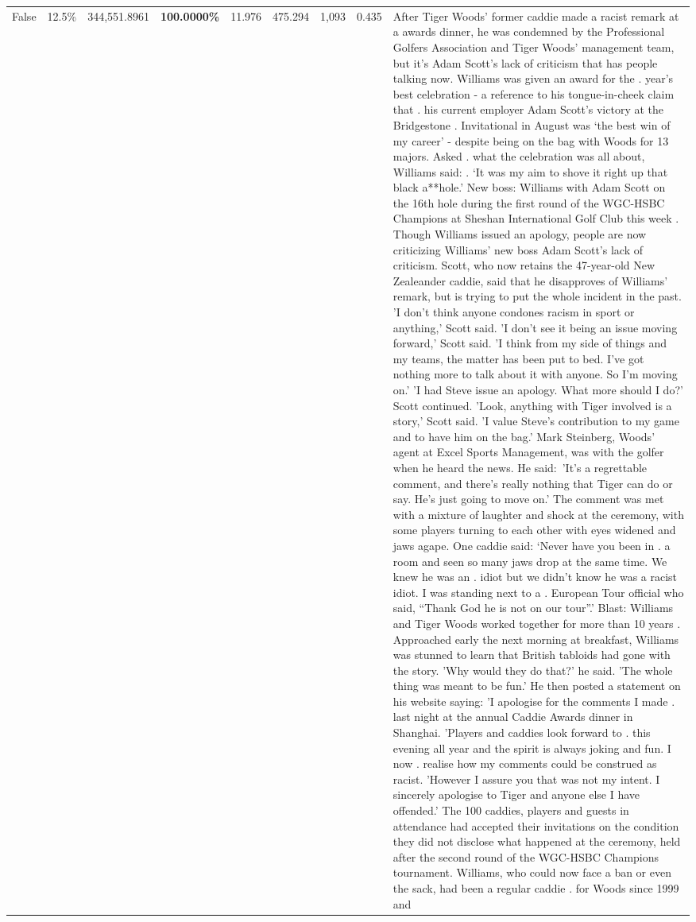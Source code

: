 \begin{table}[H]
\begin{tabular}{lllrlllll}
False & 12.5\% & 344,551.8961 & \bfseries \color{red} 100.0000\% & 11.976 & 475.294 & 1,093 & 0.435 & After Tiger Woods' former caddie made a racist remark at a awards dinner, he was condemned by the Professional Golfers Association and Tiger Woods' management team, but it's Adam Scott's lack of criticism that has people talking now. Williams was given an award for the . year’s best celebration - a reference to his tongue-in-cheek claim that . his current employer Adam Scott’s victory at the Bridgestone . Invitational in August was ‘the best win of my career’ - despite being on the bag with Woods for 13 majors. Asked . what the celebration was all about, Williams said: . ‘It was my aim to shove it right up that black a**hole.’ New boss: Williams with Adam Scott  on the 16th hole during the first round of the WGC-HSBC Champions at Sheshan International Golf Club this week . Though Williams issued an apology, people are now criticizing Williams' new boss Adam Scott's lack of criticism. Scott, who now retains the 47-year-old New Zealeander caddie, said that he disapproves of Williams' remark, but is trying to put the whole incident in the past. 'I don't think anyone condones racism in sport or anything,' Scott said. 'I don't see it being an issue moving forward,' Scott said. 'I think from my side of things and my teams, the matter has been put to bed. I've got nothing more to talk about it with anyone. So I'm moving on.' 'I had Steve issue an apology. What more should I do?' Scott continued. 'Look, anything with Tiger involved is a story,' Scott said. 'I value Steve's contribution to my game and to have him on the bag.' Mark Steinberg, Woods' agent at Excel Sports Management, was with the golfer when he heard the news. He said: 'It's a regrettable comment, and there's really nothing that Tiger can do or say. He's just going to move on.' The comment was met with a mixture of laughter and shock at the ceremony, with some players turning to each other with eyes widened and jaws agape. One caddie said: ‘Never have you been in . a room and seen so many jaws drop at the same time. We knew he was an . idiot but we didn’t know he was a racist idiot. I was standing next to a . European Tour official who said, “Thank God he is not on our tour”.’ Blast: Williams and Tiger Woods worked together for more than 10 years . Approached early the next morning at breakfast, Williams was stunned to learn that British tabloids had gone with the story. 'Why would they do that?' he said. 'The whole thing was meant to be fun.' He then posted a statement on his website saying: 'I apologise for the comments I made . last night at the annual Caddie Awards dinner in Shanghai. 'Players and caddies look forward to . this evening all year and the spirit is always joking and fun. I now . realise how my comments could be construed as racist. 'However I assure you that was not my intent. I sincerely apologise to Tiger and anyone else I have offended.' The 100 caddies, players and guests in attendance had accepted their invitations on the condition they did not disclose what happened at the ceremony, held after the second round of the WGC-HSBC Champions tournament. Williams, who could now face a ban or even the sack, had been a regular caddie . for Woods since 1999 and 
\end{tabular}
\end{table}
